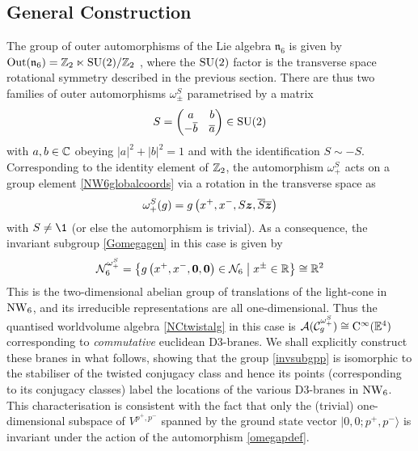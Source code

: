 \subsection{General Construction}
\label{GenConstrTwist}
The group of outer automorphisms of the Lie algebra $\mathfrak{n}_6$ is given by
${\rm Out}(\mathfrak{n}_6)={\mathbb Z}_2\ltimes{\rm SU}(2) / {\mathbb Z}_2$ \cite{SF1}, where
the ${\rm SU}(2)$ factor is the transverse space rotational symmetry described
in the previous section. There are thus two families of outer automorphisms
$\omega_\pm^S$ parametrised by a matrix
\begin{equation}
  \label{SU2matrixouter}
  S=\begin{pmatrix}a&b\\-\overline{b}&\overline{a}\end{pmatrix} \in 
  {\rm SU}(2)
\end{equation}
with $a,b\in{\mathbb C}$ obeying $|a|^2+|b|^2=1$ and with the identification
$S\sim-S$. Corresponding to the identity element of ${\mathbb Z}_2$, the automorphism
$\omega_+^S$ acts on a group element \eqref{NW6globalcoords} via a rotation in
the transverse space as
\begin{equation}
  \label{omegapdef}
  \omega_+^S(g)=g\left(x^+,x^-,S{{\boldsymbol {z} }},\overline{S} \overline{{{\boldsymbol {z} }}} \right)
\end{equation}
with $S\neq\1$ (or else the automorphism is trivial). As a consequence, the
invariant subgroup \eqref{Gomegagen} in this case is given by
\begin{equation}
  \label{invsubgpp}
  \mathcal{N}_6^{ \omega_+^S} = \bigl\{g\left(x^+,x^-,{\boldsymbol {0} },{\boldsymbol {0} }\right)
  \in\mathcal{N}_6 \bigm| x^\pm\in{\mathbb R}\bigr\} \cong {\mathbb R}^2
\end{equation}
This is the two-dimensional abelian group of translations of the light-cone in
$\operatorname{NW}_6$, and its irreducible representations are all one-dimensional. Thus the
quantised worldvolume algebra \eqref{NCtwistalg} in this case is
$\mathcal{A}(\mathcal{C}_g^{\omega_+^S})\cong{\rm C}^\infty({\mathbb E}^4)$
corresponding to {\it commutative} euclidean D3-branes. We shall explicitly
construct these branes in what follows, showing that the group \eqref{invsubgpp}
is isomorphic to the stabiliser of the twisted conjugacy class and hence its
points (corresponding to its conjugacy classes) label the locations of the
various D3-branes in $\operatorname{NW}_6$. This characterisation is consistent with the fact
that only the (trivial) one-dimensional subspace of $V^{p^+,p^-}$ spanned by the
ground state vector $|0,0;p^+,p^-\rangle$ is invariant under the action of the
automorphism \eqref{omegapdef}.

